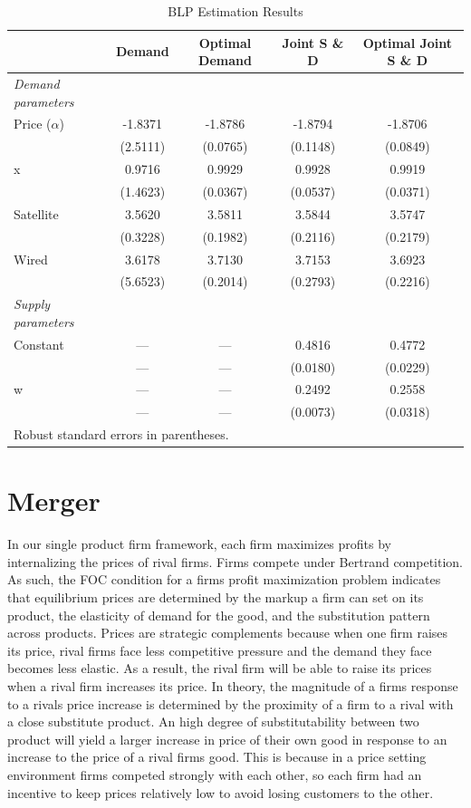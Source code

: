 \documentclass[12pt]{article}
\begin{document}
\begin{table}[H]
\centering
\caption{BLP Estimation Results}
\begin{tabular}{lcccc}
\toprule
 & Demand & Optimal Demand & Joint S \& D & Optimal Joint S \& D \\
\midrule
\textit{Demand parameters} \\
Price ($\alpha$) 
    & -1.8371 & -1.8786 & -1.8794 & -1.8706 \\
    & (2.5111) & (0.0765) & (0.1148) & (0.0849) \\
x
    & 0.9716 & 0.9929 & 0.9928 & 0.9919 \\
    & (1.4623) & (0.0367) & (0.0537) & (0.0371) \\
Satellite
    & 3.5620 & 3.5811 & 3.5844 & 3.5747 \\
    & (0.3228) & (0.1982) & (0.2116) & (0.2179) \\
Wired
    & 3.6178 & 3.7130 & 3.7153 & 3.6923 \\
    & (5.6523) & (0.2014) & (0.2793) & (0.2216) \\
\addlinespace
\textit{Supply parameters} \\
Constant
    & --- & --- & 0.4816 & 0.4772 \\
    & --- & --- & (0.0180) & (0.0229) \\
w
    & --- & --- & 0.2492 & 0.2558 \\
    & --- & --- & (0.0073) & (0.0318) \\
\midrule
\multicolumn{5}{l}{\footnotesize Robust standard errors in parentheses.} \\
\bottomrule
\end{tabular}
\end{table}

\section{Merger}
In our single product firm framework, each firm maximizes profits by internalizing the prices of rival firms. Firms compete under Bertrand competition. As such, the FOC condition for a firms profit maximization problem indicates that equilibrium prices are determined by the markup a firm can set on its product, the elasticity of demand for the good, and the substitution pattern across products. Prices are strategic complements because when one firm raises its price, rival firms face less competitive pressure and the demand they face becomes less elastic. As a result, the rival firm will be able to raise its prices when a rival firm increases its price. In theory, the magnitude of a firms response to a rivals price increase is determined by the proximity of a firm to a rival with a close substitute product. An high degree of substitutability between two product will yield a larger increase in price of their own good in response to an increase to the price of a rival firms good. This is because in a price setting environment firms competed strongly with each other, so each firm had an incentive to keep prices relatively low to avoid losing customers to the other.
\end{document}
